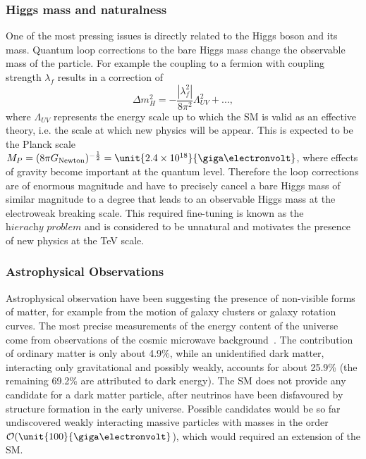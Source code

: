 \subsubsection*{Higgs mass and naturalness}
One of the most pressing issues is directly related to the Higgs boson and its mass. Quantum loop corrections to the bare Higgs mass change the observable mass of the particle. For example the coupling to a fermion with coupling strength $\lambda_f$ results in a correction of
\begin{equation}
\Delta m_{H}^2 = -\frac{|\lambda_f^2|}{8\pi^2}\Lambda_{UV}^2 + ...,
\end{equation}
where $\Lambda_{UV}$ represents the energy scale up to which the SM is valid as an effective theory, i.e. the scale at which new physics will be appear. This is expected to be the Planck scale $M_P = (8\pi G_{\mathrm{Newton}})^{-\frac{1}{2}} = \unit{2.4\times 10^{18}}{\giga\electronvolt}$, where effects of gravity become important at the quantum level. Therefore the loop corrections are of enormous magnitude and have to precisely cancel a bare Higgs mass of similar magnitude to a degree that leads to an observable Higgs mass at the electroweak breaking scale. This required fine-tuning is known as the  $\textit{hierachy problem}$ and is considered to be unnatural and motivates the presence of new physics at the TeV scale.

\subsubsection*{Astrophysical Observations}
Astrophysical observation have been suggesting the presence of non-visible forms of matter, for example from the motion of galaxy clusters or galaxy rotation curves. The most precise measurements of the energy content of the universe come from observations of the cosmic microwave background~\cite{Adam:2015rua}. The contribution of ordinary matter is only about 4.9\%, while an unidentified dark matter, interacting only gravitational and possibly weakly, accounts for about 25.9\% (the remaining 69.2\% are attributed to dark energy). The SM does not provide any candidate for a dark matter particle, after neutrinos have been disfavoured by structure formation in the early universe. Possible candidates would be so far undiscovered weakly interacting massive particles with masses in the order $\mathcal{O}(\unit{100}{\giga\electronvolt}$), which would required an extension of the SM. 

